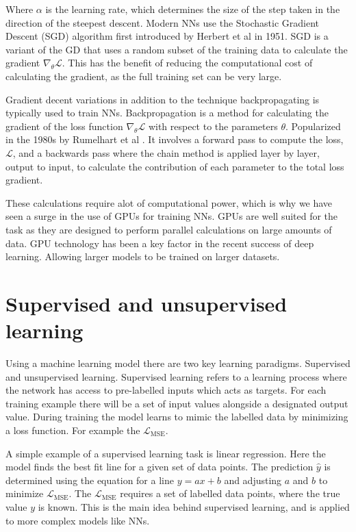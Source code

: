 Where $\alpha$ is the learning rate, which determines the size of the step taken in the direction of the steepest descent. Modern NNs use the Stochastic Gradient Descent (SGD) algorithm first introduced by Herbert et al \cite{SGD} in 1951.
SGD is a variant of the GD that uses a random subset of the training data to calculate the gradient $\nabla_\theta \mathcal{L}$. This has the benefit of reducing the computational cost of calculating the gradient, as the full training set can be very large.

Gradient decent variations in addition to the technique backpropagating is typically used to train NNs. Backpropagation is a method for calculating the gradient of the loss function $\nabla_\theta \mathcal{L}$ with respect to the parameters $\theta$. Popularized in the 1980s by Rumelhart et al \cite{backprop2}.
It involves a forward pass to compute the loss, $\mathcal{L}$, and a backwards pass where the chain method is applied layer by layer, output to input, to calculate the contribution of each parameter to the total loss gradient.

These calculations require alot of computational power, which is why we have seen a surge in the use of GPUs for training NNs. GPUs are well suited for the task as they are designed to perform parallel calculations on large amounts of data. GPU technology has been a key factor in the recent success of deep learning.
Allowing larger models to be trained on larger datasets.

\section{Supervised and unsupervised learning}
Using a machine learning model there are two key learning paradigms. Supervised and unsupervised learning. Supervised learning refers to a learning process where the network has access to pre-labelled inputs which acts as targets.
For each training example there will be a set of input values alongside a designated output value. During training the model learns to mimic the labelled data by minimizing a loss function. For example the $\mathcal{L}_\text{MSE}$.

A simple example of a supervised learning task is linear regression. Here the model finds the best fit line for a given set of data points. The prediction $\hat{y}$ is determined using the equation for a line $y = ax + b$ and adjusting $a$ and $b$ to minimize $\mathcal{L}_{\text{MSE}}$.
The $\mathcal{L}_{\text{MSE}}$ requires a set of labelled data points, where the true value $y$ is known. This is the main idea behind supervised learning, and is applied to more complex models like NNs.

